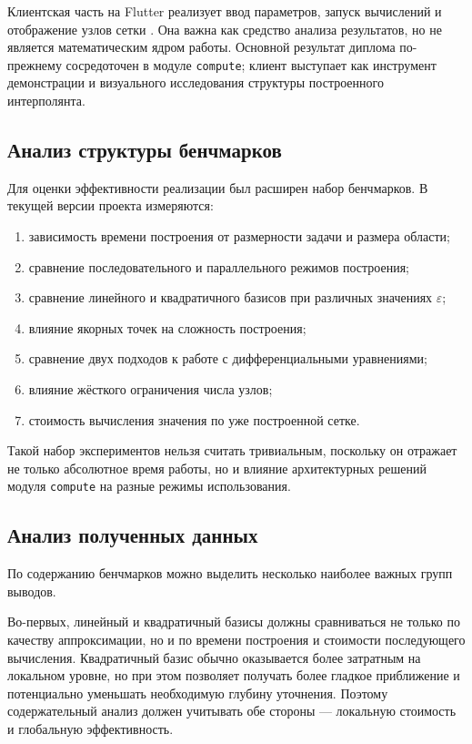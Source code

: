 Клиентская часть на Flutter реализует ввод параметров, запуск вычислений и отображение узлов сетки \cite{FlutterDocs}. Она важна как средство анализа результатов, но не является математическим ядром работы. Основной результат диплома по-прежнему сосредоточен в модуле \texttt{compute}; клиент выступает как инструмент демонстрации и визуального исследования структуры построенного интерполянта.

\subsection{Анализ структуры бенчмарков}

Для оценки эффективности реализации был расширен набор бенчмарков. В текущей версии проекта измеряются:
\begin{enumerate}
    \item зависимость времени построения от размерности задачи и размера области;
    \item сравнение последовательного и параллельного режимов построения;
    \item сравнение линейного и квадратичного базисов при различных значениях $\varepsilon$;
    \item влияние якорных точек на сложность построения;
    \item сравнение двух подходов к работе с дифференциальными уравнениями;
    \item влияние жёсткого ограничения числа узлов;
    \item стоимость вычисления значения по уже построенной сетке.
\end{enumerate}

Такой набор экспериментов нельзя считать тривиальным, поскольку он отражает не только абсолютное время работы, но и влияние архитектурных решений модуля \texttt{compute} на разные режимы использования.

\subsection{Анализ полученных данных}

По содержанию бенчмарков можно выделить несколько наиболее важных групп выводов.

Во-первых, линейный и квадратичный базисы должны сравниваться не только по качеству аппроксимации, но и по времени построения и стоимости последующего вычисления. Квадратичный базис обычно оказывается более затратным на локальном уровне, но при этом позволяет получать более гладкое приближение и потенциально уменьшать необходимую глубину уточнения. Поэтому содержательный анализ должен учитывать обе стороны --- локальную стоимость и глобальную эффективность.

